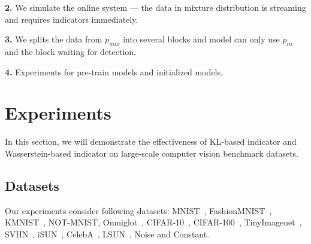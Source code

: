 \documentclass[letterpaper]{article} %
\newcommand{\pin}{p_{in}}
\newcommand{\pmix}{p_{mix}}
\begin{document}
\noindent \textbf{2.} We simulate the online system --- the data in mixture distribution is streaming and requires indicators immediately. 

\noindent \textbf{3.} We splits the data from $\pmix$ into several blocks and model can only use $\pin$ and the block waiting for detection.  

\noindent \textbf{4.} Experiments for pre-train models and initialized models. 

\section{Experiments}\label{sec6}
In this section, we will demonstrate the effectiveness of KL-based indicator and Wasserstein-based indicator on large-scale computer vision benchmark datasets. 

\subsection{Datasets}

Our experiments consider following datasets: MNIST~\cite{lecun1998gradient-based}, FashionMNIST~\cite{xiao2017/online}, KMNIST~\cite{clanuwat2018deep}, NOT-MNIST, Omniglot~\cite{lake2015human}, CIFAR-10~\cite{krizhevsky2009learning}, CIFAR-100~\cite{krizhevsky2009learning}, TinyImagenet~\cite{deng2009imagenet}, SVHN~\cite{netzer2011reading}, iSUN~\cite{xu2015turkergaze}, CelebA~\cite{liu2015deep}, LSUN~\cite{yu2015lsun}, Noise and Constant. 
\end{document}
